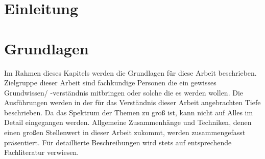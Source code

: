 \documentclass[a4paper,11pt, twoside, openright]{scrbook}
\begin{document}
\frontmatter 









\tableofcontents 
%
\listoffigures
%
\listoftables
%
\lstlistoflistings
%

%


\mainmatter 




\chapter{Einleitung}
%

%
\chapter{Grundlagen}
Im Rahmen dieses Kapitels werden die Grundlagen für diese Arbeit beschrieben. 
Zielgruppe dieser Arbeit sind fachkundige Personen die ein gewisses Grundwissen/ -verständnis mitbringen oder solche die es werden wollen. Die Ausführungen werden in der für das Verständnis dieser Arbeit angebrachten Tiefe beschrieben. Da das Spektrum der Themen zu groß ist, kann nicht auf Alles im Detail eingegangen werden. Allgemeine Zusammenhänge und Techniken, denen einen großen Stellenwert in dieser Arbeit zukommt, werden zusammengefasst präsentiert. Für detaillierte Beschreibungen wird stets auf entsprechende Fachliteratur verwiesen.\\
%
\end{document}
